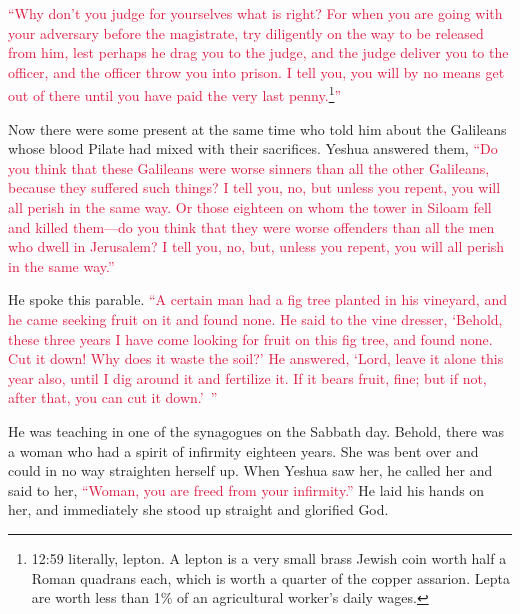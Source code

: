 \myverse{}\textcolor{crimson}{“Why don’t you judge for yourselves what is right?
}
\myverse{}\textcolor{crimson}{For when you are going with your adversary before the magistrate, try
	diligently on the way to be released from him, lest perhaps he drag you to the judge, and the judge deliver
	you to the officer, and the officer throw you into prison.
}
\myverse{}\textcolor{crimson}{I tell you, you will by no means get out of there until you have paid
	the very last penny.}\footnote{12:59 literally, lepton. A lepton is a very small brass Jewish coin worth half a Roman quadrans each,
	which is worth a quarter of the copper assarion. Lepta are worth less than 1\% of an agricultural worker’s
	daily wages.}\textcolor{crimson}{”}


\mychapter{} \myverse*{}Now there were some present at the same time who told him about
the Galileans whose blood Pilate had mixed with their sacrifices.
\myverse{}Yeshua answered them,
\textcolor{crimson}{“Do you think that these Galileans were worse sinners than all the other Galileans, because they suffered
	such things?
}
\myverse{}\textcolor{crimson}{I tell you, no, but unless you repent, you will all perish in the same
	way.
}
\myverse{}\textcolor{crimson}{Or those eighteen on whom the tower in Siloam fell and killed them—do you
	think that they were worse offenders than all the men who dwell in Jerusalem?
}
\myverse{}\textcolor{crimson}{I tell you, no, but, unless you repent, you will all perish in the same
	way.”}

\myverse{}He spoke this parable.
\textcolor{crimson}{“A certain man had a fig tree planted in his vineyard, and he came seeking fruit on it and found none.
}
\myverse{}\textcolor{crimson}{He said to the vine dresser, ‘Behold, these three years I have come looking
	for fruit on this fig tree, and found none. Cut it down! Why does it waste the soil?’
}
\myverse{}\textcolor{crimson}{He answered, ‘Lord, leave it alone this year also, until I dig around it
	and fertilize it.
}
\myverse{}\textcolor{crimson}{If it bears fruit, fine; but if not, after that, you can cut it down.’ ”}

\myverse{}He was teaching in one of the synagogues on the Sabbath day.
\myverse{}Behold, there was a woman who had a spirit of infirmity eighteen years. She
was bent over and could in no way straighten herself up.
\myverse{}When Yeshua saw her, he called her and said to her,
\textcolor{crimson}{“Woman, you are freed from your infirmity.”}
\myverse{}He laid his hands on her, and immediately she stood up straight and glorified
God.

